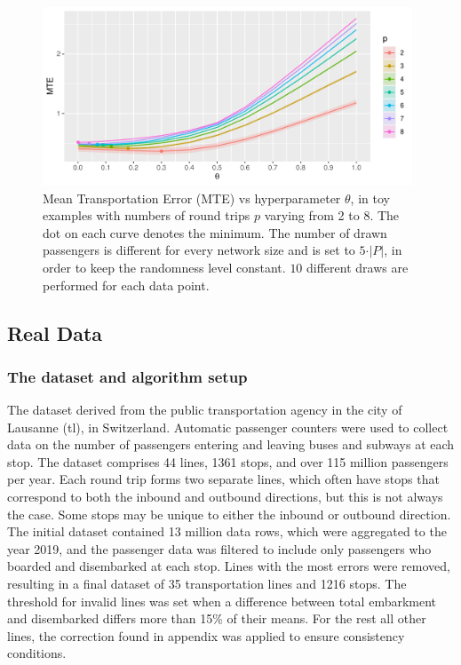 \documentclass{bmcart}
\begin{document}
\begin{figure}[h]
	\includegraphics[width=0.98\textwidth]{fig/MTE_tours.pdf}
	\caption{Mean Transportation Error (MTE) vs hyperparameter $\theta$, in toy examples with numbers of round trips $p$ varying from 2 to 8. The dot on each curve denotes the minimum. The number of drawn passengers is different for every network size and is set to $5 \cdot \vert P \vert$, in order to keep the randomness level constant. $10$ different draws are performed for each data point.}
	\label{MTE_vs_theta}
\end{figure}

\subsection{Real Data}
\label{real_data}

\subsubsection{The dataset and algorithm setup}
\label{data_algo}
The dataset derived from the public transportation agency in the city of Lausanne (tl), in Switzerland. Automatic passenger counters were used to collect data on the number of passengers entering and leaving buses and subways at each stop. The dataset comprises 44 lines, 1361 stops, and over 115 million passengers per year. Each round trip forms two separate lines, which often have stops that correspond to both the inbound and outbound directions, but this is not always the case. Some stops may be unique to either the inbound or outbound direction. The initial dataset contained 13 million data rows, which were aggregated to the year 2019, and the passenger data was filtered to include only passengers who boarded and disembarked at each stop. Lines with the most errors were removed, resulting in a final dataset of 35 transportation lines and 1216 stops. The threshold for invalid lines was set when a difference between total embarkment and disembarked differs more than 15\% of their means. For the rest all other lines, the correction found in appendix was applied to ensure consistency conditions.  
\end{document}
